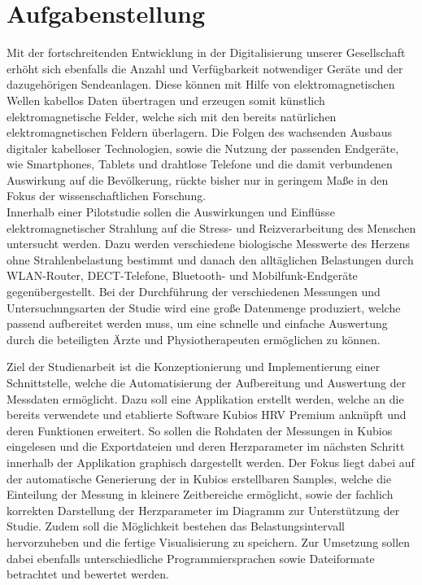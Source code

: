 
\chapter{Aufgabenstellung}

Mit der fortschreitenden Entwicklung in der Digitalisierung unserer Gesellschaft erhöht sich ebenfalls die Anzahl und Verfügbarkeit notwendiger Geräte und der dazugehörigen Sendeanlagen. Diese können mit Hilfe von elektromagnetischen Wellen kabellos Daten übertragen und erzeugen somit künstlich elektromagnetische Felder, welche sich mit den bereits natürlichen elektromagnetischen Feldern überlagern. Die Folgen des wachsenden Ausbaus digitaler kabelloser Technologien, sowie die Nutzung der passenden Endgeräte, wie Smartphones, Tablets und drahtlose Telefone und die damit verbundenen Auswirkung auf die Bevölkerung, rückte bisher nur in geringem Maße in den Fokus der wissenschaftlichen Forschung.\\
Innerhalb einer Pilotstudie sollen die Auswirkungen und Einflüsse elektromagnetischer Strahlung auf die Stress- und Reizverarbeitung des Menschen untersucht werden. Dazu werden verschiedene biologische Messwerte des Herzens ohne Strahlenbelastung bestimmt und danach den alltäglichen Belastungen durch WLAN-Router, DECT-Telefone, Bluetooth- und Mobilfunk-Endgeräte gegenübergestellt. Bei der Durchführung der verschiedenen Messungen und Untersuchungsarten der Studie wird eine große Datenmenge produziert, welche passend aufbereitet werden muss, um eine schnelle und einfache Auswertung durch die beteiligten Ärzte und Physiotherapeuten ermöglichen zu können.

Ziel der Studienarbeit ist die Konzeptionierung und Implementierung einer Schnittstelle, welche die Automatisierung der Aufbereitung und Auswertung der Messdaten ermöglicht. Dazu soll eine Applikation erstellt werden, welche an die bereits verwendete und etablierte Software Kubios HRV Premium anknüpft und deren Funktionen erweitert. So sollen die Rohdaten der Messungen in Kubios eingelesen und die Exportdateien und deren Herzparameter im nächsten Schritt innerhalb der Applikation graphisch dargestellt werden. Der Fokus liegt dabei auf der automatische Generierung der in Kubios erstellbaren Samples, welche die Einteilung der Messung in kleinere Zeitbereiche ermöglicht, sowie der fachlich korrekten Darstellung der Herzparameter im Diagramm zur Unterstützung der Studie. Zudem soll die Möglichkeit bestehen das Belastungsintervall hervorzuheben und die fertige Visualisierung zu speichern. Zur Umsetzung sollen dabei ebenfalls unterschiedliche Programmiersprachen sowie Dateiformate betrachtet und bewertet werden. 